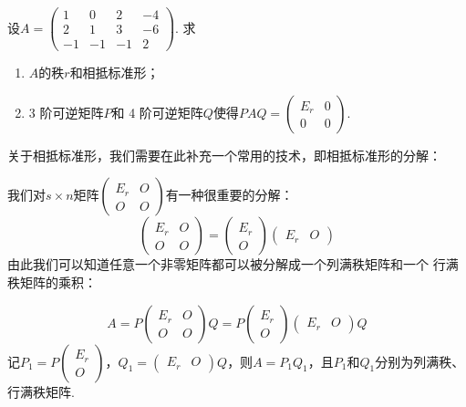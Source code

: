 \begin{example}
    设$A=\begin{pmatrix}
        1 & 0 & 2 & -4 \\ 2 & 1 & 3 & -6 \\ -1 & -1 & -1 & 2
    \end{pmatrix}$. 求
    \begin{enumerate}
        \item $A$的秩$r$和相抵标准形；

        \item 3 阶可逆矩阵$P$和 4 阶可逆矩阵$Q$使得$PAQ=\begin{pmatrix}
            E_r & 0 \\ 0 & 0
        \end{pmatrix}$.
    \end{enumerate}
\end{example}

关于相抵标准形，我们需要在此补充一个常用的技术，即相抵标准形的分解：

我们对$s \times n$矩阵$\begin{pmatrix}
    E_r & O \\ O & O
\end{pmatrix}$有一种很重要的分解：
\[\begin{pmatrix}
    E_r & O \\ O & O
\end{pmatrix}=\begin{pmatrix}
    E_r \\ O
\end{pmatrix}\begin{pmatrix}
    E_r & O
\end{pmatrix}\]
由此我们可以知道任意一个非零矩阵都可以被分解成一个列满秩矩阵和一个
行满秩矩阵的乘积：

\[A=P\begin{pmatrix}
    E_r & O \\ O & O
\end{pmatrix}Q=P\begin{pmatrix}
    E_r \\ O
\end{pmatrix}\begin{pmatrix}
    E_r & O
\end{pmatrix}Q\]
记$P_1=P\begin{pmatrix}
    E_r \\ O
\end{pmatrix}$，$Q_1=\begin{pmatrix}
    E_r & O
\end{pmatrix}Q$，则$A=P_1Q_1$，且$P_1$和$Q_1$分别为列满秩、行满秩矩阵.

